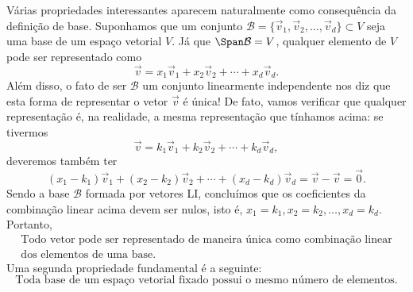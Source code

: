 Várias propriedades interessantes aparecem naturalmente como consequência da definição de base. Suponhamos que um conjunto $\mathcal{B} = \{\vec{v}_1, \vec{v}_2, \dots, \vec{v}_d\} \subset V$ seja uma base de um espaço vetorial $V$. Já que $\Span \mathcal{B} = V$, qualquer elemento de $V$ pode ser representado como
\begin{equation}
\vec{v} = x_1 \vec{v}_1 + x_2 \vec{v}_2 + \cdots + x_d \vec{v}_d.
\end{equation} Além disso, o fato de ser $\mathcal{B}$ um conjunto linearmente independente nos diz que esta forma de representar o vetor $\vec{v}$ é única! De fato, vamos verificar que qualquer representação é, na realidade, a mesma representação que tínhamos acima: se tivermos
\begin{equation}
\vec{v} = k_1 \vec{v}_1 + k_2 \vec{v}_2 + \cdots + k_d \vec{v}_d,
\end{equation} deveremos também ter
\begin{equation}
(x_1-k_1) \vec{v}_1 + (x_2-k_2) \vec{v}_2 + \cdots + (x_d-k_d) \vec{v}_d = \vec{v} - \vec{v} = \vec{0}.
\end{equation} Sendo a base $\mathcal{B}$ formada por vetores LI, concluímos que os coeficientes da combinação linear acima devem ser nulos, isto é, $x_1=k_1, x_2=k_2,\dots,x_d=k_d$. Portanto,
\begin{equation}
\boxed{
	\begin{array}{c}
\text{Todo vetor pode ser representado de maneira única como combinação linear} \\ \text{dos elementos de uma base.}
	\end{array}
}
\end{equation}
Uma segunda propriedade fundamental é a seguinte:
\begin{equation}
\boxed{
	\text{Toda base de um espaço vetorial fixado possui o mesmo número de elementos.}
}
\end{equation}


